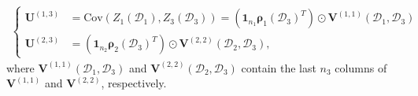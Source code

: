 \documentclass[12pt]{article}
\newcommand{\bs}[1]{\boldsymbol{#1}}
\begin{document}
\begin{align*}
\begin{cases}
    \bs{U}^{(1,3)} &= \text{Cov}(Z_1(\mathcal{D}_1),Z_3(\mathcal{D}_3)) %
    = (\bs{1}_{n_1}\bs{\rho}_1(\mathcal{D}_3)^T)\odot \bs{V}^{(1,1)}(\mathcal{D}_1,\mathcal{D}_3)\\
    \bs{U}^{(2,3)} &= (\bs{1}_{n_2}\bs{\rho}_2(\mathcal{D}_3)^T)\odot \bs{V}^{(2,2)}(\mathcal{D}_2,\mathcal{D}_3),
\end{cases}
\end{align*}
where $\bs{V}^{(1,1)}(\mathcal{D}_1,\mathcal{D}_3)$ and $\bs{V}^{(2,2)}(\mathcal{D}_2,\mathcal{D}_3)$ contain the last $n_3$ columns of $\bs{V}^{(1,1)}$ and $\bs{V}^{(2,2)}$, respectively.
\end{document}
